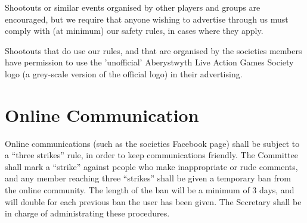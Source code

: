 \documentclass{report}
\newcommand{\society}{Aberystwyth Live Action Games Society}
\begin{document}
Shootouts or similar events organised by other players and groups are encouraged, but we require that anyone wishing to advertise through us must comply with (at minimum) our safety rules, in cases where they apply.

Shootouts that do use our rules, and that are organised by the societies members have permission to use the 'unofficial' \society{} logo (a grey-scale version of the official logo) in their advertising.

\section{Online Communication}

Online communications (such as the societies Facebook page) shall be subject to a ``three strikes'' rule, in order to keep communications friendly.
The Committee shall mark a ``strike'' against people who make inappropriate or rude comments, and any member reaching three ``strikes'' shall be given a temporary ban from the online community.
The length of the ban will be a minimum of 3 days, and will double for each previous ban the user has been given.
The Secretary shall be in charge of administrating these procedures.
\end{document}
